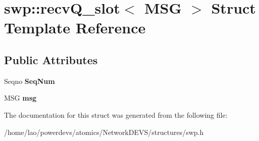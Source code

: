 \hypertarget{structswp_1_1recvQ__slot}{}\section{swp\+:\+:recv\+Q\+\_\+slot$<$ M\+SG $>$ Struct Template Reference}
\label{structswp_1_1recvQ__slot}
\subsection*{Public Attributes}
\begin{DoxyCompactItemize}
\item 
Seqno {\bfseries Seq\+Num}\hypertarget{structswp_1_1recvQ__slot_a4a2c4cf9141945c17a8f8f786e2c4af6}{}\label{structswp_1_1recvQ__slot_a4a2c4cf9141945c17a8f8f786e2c4af6}

\item 
M\+SG {\bfseries msg}\hypertarget{structswp_1_1recvQ__slot_a4df4f027822cffdb873cc49eb2d55619}{}\label{structswp_1_1recvQ__slot_a4df4f027822cffdb873cc49eb2d55619}

\end{DoxyCompactItemize}


The documentation for this struct was generated from the following file\+:\begin{DoxyCompactItemize}
\item 
/home/lao/powerdevs/atomics/\+Network\+D\+E\+V\+S/structures/swp.\+h\end{DoxyCompactItemize}

